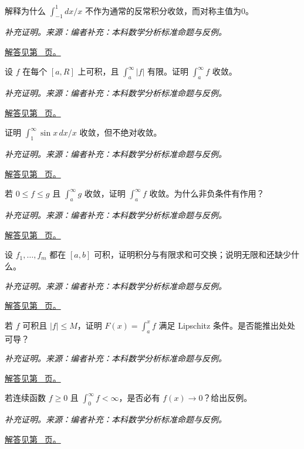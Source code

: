 \documentclass[UTF8,12pt,a4paper,fontset=fandol]{ctexart}
\begin{document}
\begin{example}[反常积分的内部奇点]\label{ex:c30q14}
解释为什么 $\int_{-1}^1dx/x$ 不作为通常的反常积分收敛，而对称主值为0。
\par\textit{补充证明。来源：编者补充：本科数学分析标准命题与反例。}\par\hyperref[ans:c30q14]{解答见第~\pageref{ans:c30q14} 页。}
\end{example}
\begin{example}[绝对收敛蕴含积分收敛]\label{ex:c30q15}
设 $f$ 在每个 $[a,R]$ 上可积，且 $\int_a^\infty|f|$ 有限。证明 $\int_a^\infty f$ 收敛。
\par\textit{补充证明。来源：编者补充：本科数学分析标准命题与反例。}\par\hyperref[ans:c30q15]{解答见第~\pageref{ans:c30q15} 页。}
\end{example}
\begin{example}[正弦除以变量的条件收敛]\label{ex:c30q16}
证明 $\int_1^\infty\sin x\,dx/x$ 收敛，但不绝对收敛。
\par\textit{补充证明。来源：编者补充：本科数学分析标准命题与反例。}\par\hyperref[ans:c30q16]{解答见第~\pageref{ans:c30q16} 页。}
\end{example}
\begin{example}[积分比较的条件边界]\label{ex:c30q17}
若 $0\le f\le g$ 且 $\int_a^\infty g$ 收敛，证明 $\int_a^\infty f$ 收敛。为什么非负条件有作用？
\par\textit{补充证明。来源：编者补充：本科数学分析标准命题与反例。}\par\hyperref[ans:c30q17]{解答见第~\pageref{ans:c30q17} 页。}
\end{example}
\begin{example}[求和与积分的有限交换]\label{ex:c30q18}
设 $f_1,\ldots,f_m$ 都在 $[a,b]$ 可积，证明积分与有限求和可交换；说明无限和还缺少什么。
\par\textit{补充证明。来源：编者补充：本科数学分析标准命题与反例。}\par\hyperref[ans:c30q18]{解答见第~\pageref{ans:c30q18} 页。}
\end{example}
\begin{example}\label{ex:c30q19}
若 $f$ 可积且 $|f|\le M$，证明 $F(x)=\int_a^xf$ 满足 Lipschitz 条件。是否能推出处处可导？
\par\textit{补充证明。来源：编者补充：本科数学分析标准命题与反例。}\par\hyperref[ans:c30q19]{解答见第~\pageref{ans:c30q19} 页。}
\end{example}
\begin{example}[非负积分与函数趋零]\label{ex:c30q20}
若连续函数 $f\ge0$ 且 $\int_0^\infty f<\infty$，是否必有 $f(x)\to0$？给出反例。
\par\textit{补充证明。来源：编者补充：本科数学分析标准命题与反例。}\par\hyperref[ans:c30q20]{解答见第~\pageref{ans:c30q20} 页。}
\end{example}
\end{document}
